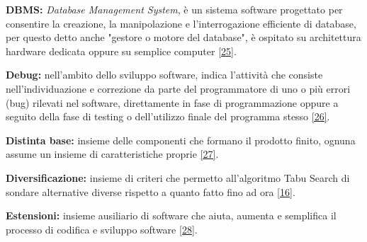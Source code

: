 \begin{description}
     \item \label{DBMS} \textbf{DBMS:} \textit{Database Management System}, è un sistema software progettato per consentire la creazione, la manipolazione e l'interrogazione efficiente di database, 
    per questo detto anche "gestore o motore del database", è ospitato su architettura hardware dedicata oppure su semplice computer \hyperref[dbms]{[25]}.
    
    \item \label{Debug} \textbf{Debug:} nell'ambito dello sviluppo software, indica l'attività che consiste nell'individuazione e correzione da parte del programmatore di uno o più errori (bug) rilevati
     nel software, direttamente in fase di programmazione oppure a seguito della fase di testing o dell'utilizzo finale del programma stesso \hyperref[debug]{[26]}.
    
     \item \label{Distinta base} \textbf{Distinta base:} insieme delle componenti che formano il prodotto finito, ognuna assume un insieme di caratteristiche proprie \hyperref[distinta-base]{[27]}.
    
     \item \label{Diversificazione} \textbf{Diversificazione:} insieme di criteri che permetto all'algoritmo Tabu Search di sondare alternative diverse rispetto a quanto fatto fino ad ora \hyperref[slide]{[16]}.
    
     \item \label{Estensioni} \textbf{Estensioni:} insieme ausiliario di software che aiuta, aumenta e semplifica il processo di codifica e sviluppo software \hyperref[estensione]{[28]}.
    

\end{description}
